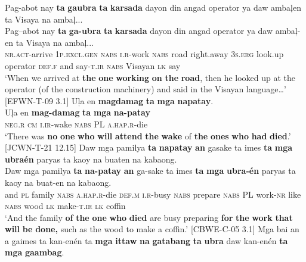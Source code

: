 \ea
\label{bkm:Ref417973067}
Pag-abot  nay  \textbf{ta}  \textbf{gaubra}  \textbf{ta}  \textbf{karsada}  dayon  din angad  operator  ya  daw  ambaļen  ta  Visaya  na  ambaļ... \\\smallskip
 \gll Pag--abot  nay  \textbf{ta}  \textbf{ga-ubra}  \textbf{ta}  \textbf{karsada}  dayon  din angad  operator  ya  daw  ambaļ-en  ta  Visaya  na  ambaļ... \\
\textsc{nr.act}-arrive  1\textsc{p.excl.gen}  \textsc{nabs}  \textsc{i.r}-work  \textsc{nabs}  road  right.away  3\textsc{s.erg}
look.up  operator  \textsc{def.f}  and  say-\textsc{t.ir}  \textsc{nabs}  Visayan  \textsc{lk}  say \\
\glt `When we arrived at \textbf{the} \textbf{one} \textbf{working} \textbf{on} \textbf{the} \textbf{road}, then he looked up at the operator (of the construction machinery) and said in the Visayan language…’ [EFWN-T-09 3.1]
\z
\ea
\label{bkm:Ref447710237}
Uļa  en  \textbf{magdamag}  \textbf{ta}  \textbf{mga}  \textbf{napatay}. \\\smallskip
 \gll Uļa  en  \textbf{mag-damag}  \textbf{ta}  \textbf{mga}  \textbf{na-patay} \\
\textsc{neg.r}  \textsc{cm}  \textsc{i.ir}-wake  \textsc{nabs}  \textsc{PL}  \textsc{a.hap.r}-die \\
\glt ‘There was \textbf{no} \textbf{one} \textbf{who} \textbf{will} \textbf{attend} \textbf{the} \textbf{wake} of \textbf{the} \textbf{ones} \textbf{who} \textbf{had} \textbf{died}.’ [JCWN-T-21 12.15]
\z
\ea
\label{bkm:Ref417973212}
Daw  mga  pamilya  \textbf{ta}  \textbf{napatay}  \textbf{an}  gasake  ta  imes \textbf{ta}  \textbf{mga}  \textbf{ubraén}  paryas  ta  kaoy  na  buaten  na  kabaong. \\\smallskip
 \gll Daw  mga  pamilya  \textbf{ta}  \textbf{na-patay}  \textbf{an}  ga-sake  ta  imes \textbf{ta}  \textbf{mga}  \textbf{ubra-én}  paryas  ta  kaoy  na  buat-en  na  kabaong. \\
and  \textsc{pl}  family  \textsc{nabs}  \textsc{a.hap.r}\textsc{-}die  \textsc{d}\textsc{ef.m}  \textsc{i.r}-busy  \textsc{nabs}  prepare
\textsc{nabs}  \textsc{PL}  work-\textsc{nr}  like  \textsc{nabs}  wood  \textsc{lk}  make-\textsc{t.ir}  \textsc{lk}  coffin \\
\glt `And the family \textbf{of} \textbf{the} \textbf{one} \textbf{who} \textbf{died} are busy preparing \textbf{for} \textbf{the} \textbf{work} \textbf{that} \textbf{will} \textbf{be} \textbf{done,} such as the wood to make a coffin.’ [CBWE-C-05 3.1]
\z
\ea
Mga  bai  an  a  gaimes  ta  kan-enén  ta \textbf{mga}  \textbf{ittaw}  \textbf{na}  \textbf{gatabang}  \textbf{ta}  \textbf{ubra}  daw  kan-enén  \textbf{ta}  \textbf{mga}  \textbf{gaambag}. \\\smallskip
